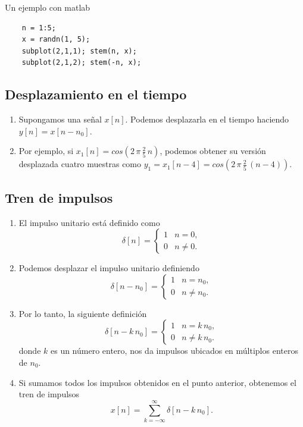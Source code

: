 Un ejemplo con matlab
\begin{verbatim}
	n = 1:5;
	x = randn(1, 5);
	subplot(2,1,1); stem(n, x); 
	subplot(2,1,2); stem(-n, x);
\end{verbatim}

\subsection{Desplazamiento en el tiempo}

\begin{enumerate}
\item Supongamos una se\~{n}al $x[n]$. Podemos desplazarla en el tiempo
haciendo $y[n] = x[n - n_{0}]$.

\item Por ejemplo, si $x_{1}[n] = cos(2 \, \pi \, \frac{2}{5} \, n)$,
  podemos obtener su versi\'{o}n desplazada cuatro muestras como
  $y_{1} = x_{1}[n - 4] =  cos(2 \, \pi \, \frac{2}{5} \, (n - 4))$.
\end{enumerate}

\subsection{Tren de impulsos}

\begin{enumerate}
\item El impulso unitario est\'{a} definido como
\begin{equation}
\delta[n] = \left\{ \begin{array}{cc}
1 & n = 0, \\
0 & n \neq 0.
\end{array}
\right.
\end{equation}

\item Podemos desplazar el impulso unitario definiendo
\begin{equation}
\delta[n - n_{0}] = \left\{ \begin{array}{cc}
1 & n = n_{0},  \\
0 & n \neq n_{0}.
\end{array}
\right.
\end{equation}

\item Por lo tanto, la siguiente definici\'{o}n 
\begin{equation}
\delta[n - k \, n_{0}] = \left\{ \begin{array}{cc}
1 & n = k \, n_{0},  \\
0 & n \neq k \, n_{0}.
\end{array}
\right.
\end{equation}
donde $k$ es un n\'{u}mero entero, 
nos da impulsos ubicados en m\'{u}ltiplos enteros de $n_{0}$.

\item Si sumamos todos los impulsos obtenidos en el punto anterior,
  obtenemos el tren de impulsos
\begin{equation}
x[n] = \sum_{k=-\infty}^{\infty} \delta[n - k \, n_{0}].
\end{equation}

\end{enumerate}


